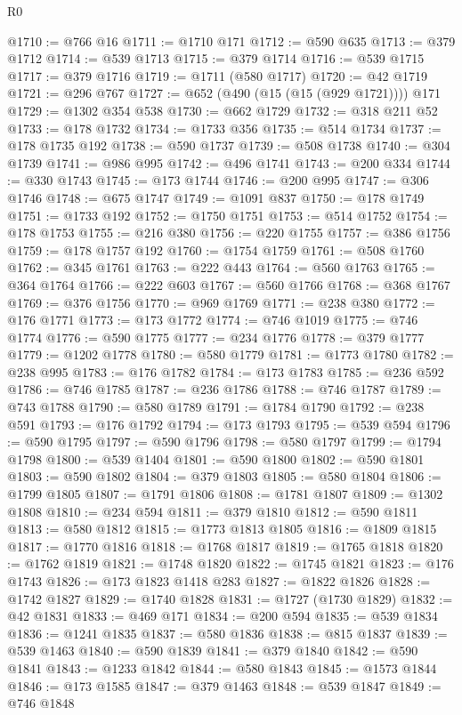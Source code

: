\begin{lexlean}{R0}
\begin{coremodule}
@1710 := @766 @16
@1711 := @1710 @171
@1712 := @590 @635
@1713 := @379 @1712
@1714 := @539 @1713
@1715 := @379 @1714
@1716 := @539 @1715
@1717 := @379 @1716
@1719 := @1711 (@580 @1717)
@1720 := @42 @1719
@1721 := @296 @767
@1727 := @652 (@490 (@15 (@15 (@929 @1721)))) @171
@1729 := @1302 @354 @538
@1730 := @662 @1729
@1732 := @318 @211 @52
@1733 := @178 @1732
@1734 := @1733 @356
@1735 := @514 @1734
@1737 := @178 @1735 @192
@1738 := @590 @1737
@1739 := @508 @1738
@1740 := @304 @1739
@1741 := @986 @995
@1742 := @496 @1741
@1743 := @200 @334
@1744 := @330 @1743
@1745 := @173 @1744
@1746 := @200 @995
@1747 := @306 @1746
@1748 := @675 @1747
@1749 := @1091 @837
@1750 := @178 @1749
@1751 := @1733 @192
@1752 := @1750 @1751
@1753 := @514 @1752
@1754 := @178 @1753
@1755 := @216 @380
@1756 := @220 @1755
@1757 := @386 @1756
@1759 := @178 @1757 @192
@1760 := @1754 @1759
@1761 := @508 @1760
@1762 := @345 @1761
@1763 := @222 @443
@1764 := @560 @1763
@1765 := @364 @1764
@1766 := @222 @603
@1767 := @560 @1766
@1768 := @368 @1767
@1769 := @376 @1756
@1770 := @969 @1769
@1771 := @238 @380
@1772 := @176 @1771
@1773 := @173 @1772
@1774 := @746 @1019
@1775 := @746 @1774
@1776 := @590 @1775
@1777 := @234 @1776
@1778 := @379 @1777
@1779 := @1202 @1778
@1780 := @580 @1779
@1781 := @1773 @1780
@1782 := @238 @995
@1783 := @176 @1782
@1784 := @173 @1783
@1785 := @236 @592
@1786 := @746 @1785
@1787 := @236 @1786
@1788 := @746 @1787
@1789 := @743 @1788
@1790 := @580 @1789
@1791 := @1784 @1790
@1792 := @238 @591
@1793 := @176 @1792
@1794 := @173 @1793
@1795 := @539 @594
@1796 := @590 @1795
@1797 := @590 @1796
@1798 := @580 @1797
@1799 := @1794 @1798
@1800 := @539 @1404
@1801 := @590 @1800
@1802 := @590 @1801
@1803 := @590 @1802
@1804 := @379 @1803
@1805 := @580 @1804
@1806 := @1799 @1805
@1807 := @1791 @1806
@1808 := @1781 @1807
@1809 := @1302 @1808
@1810 := @234 @594
@1811 := @379 @1810
@1812 := @590 @1811
@1813 := @580 @1812
@1815 := @1773 @1813 @1805
@1816 := @1809 @1815
@1817 := @1770 @1816
@1818 := @1768 @1817
@1819 := @1765 @1818
@1820 := @1762 @1819
@1821 := @1748 @1820
@1822 := @1745 @1821
@1823 := @176 @1743
@1826 := @173 @1823 @1418 @283
@1827 := @1822 @1826
@1828 := @1742 @1827
@1829 := @1740 @1828
@1831 := @1727 (@1730 @1829)
@1832 := @42 @1831
@1833 := @469 @171
@1834 := @200 @594
@1835 := @539 @1834
@1836 := @1241 @1835
@1837 := @580 @1836
@1838 := @815 @1837
@1839 := @539 @1463
@1840 := @590 @1839
@1841 := @379 @1840
@1842 := @590 @1841
@1843 := @1233 @1842
@1844 := @580 @1843
@1845 := @1573 @1844
@1846 := @173 @1585
@1847 := @379 @1463
@1848 := @539 @1847
@1849 := @746 @1848

\end{coremodule}
\end{lexlean}
